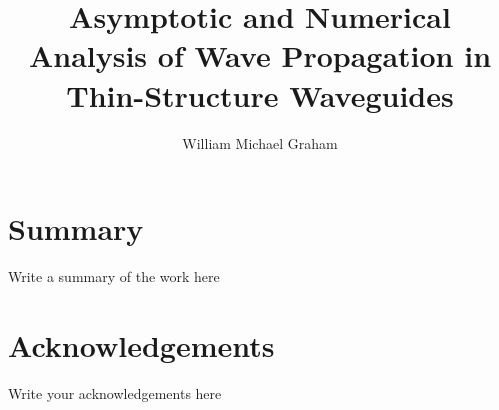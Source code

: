 \documentclass[a4paper]{report}
\title{Asymptotic and Numerical Analysis of Wave Propagation in Thin-Structure Waveguides}
\author{William Michael Graham}
\begin{document}
\maketitle


\License



\chapter*{Summary}
Write a summary of the work here

\chapter*{Acknowledgements}
Write your acknowledgements here

\tableofcontents

\cleardoublepage %
\listoffigures %

\cleardoublepage
{}











\newpage


\end{document}
